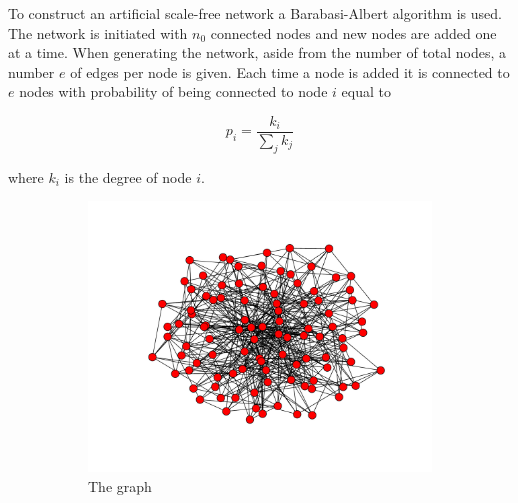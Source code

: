 To construct an artificial scale-free network a Barabasi-Albert algorithm \cite{albert2002statistical} is used. 
The network is initiated with $n_0$ connected nodes and new nodes are added one at a time.
When generating the network, aside from the number of total nodes, a number $e$ of edges per node is given.
Each time a node is added it is connected to $e$ nodes with probability of being connected to node $i$ equal to

\begin{displaymath}
p_i = \frac{k_i}{\sum_j k_j}
\end{displaymath}

where $k_i$ is the degree of node $i$.

\begin{figure}[h]
        \centering
        \begin{subfigure}[b]{0.5\textwidth}
        	\centering
                \includegraphics[width=\textwidth]{images/topology/scale_free_barabasi_graph.pdf}
                \caption{The graph}
        \end{subfigure}
        \begin{subfigure}[b]{0.4\textwidth}
        	\centering

\end{subfigure}
\end{figure}
